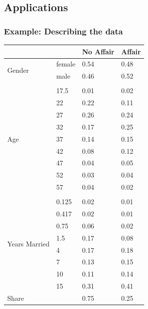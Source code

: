 \documentclass{beamer}
\newcommand{\1}{\mathbb{1}}
\begin{document}
\subsection{Applications}

\begin{frame}
\end{frame}

\begin{frame}\frametitle{Example: Describing the data}
{\tiny
\begin{table}[ht]
\centering
\begin{tabular}{llll}
  \toprule 
 & & No Affair & Affair \\ \hline \hline 
 \multirow{2}{*}{Gender} & female & 0.54 & 0.48 \\ 
     & male & 0.46 & 0.52 \\ \\
  \multirow{9}{*}{Age} & 17.5 & 0.01 & 0.02 \\ 
    & 22 & 0.22 & 0.11 \\ 
    & 27 & 0.26 & 0.24 \\ 
    & 32 & 0.17 & 0.25 \\ 
    & 37 & 0.14 & 0.15 \\ 
    & 42 & 0.08 & 0.12 \\ 
    & 47 & 0.04 & 0.05 \\ 
    & 52 & 0.03 & 0.04 \\ 
    & 57 & 0.04 & 0.02 \\ \\
  \multirow{8}{*}{Years Married} & 0.125 & 0.02 & 0.01 \\ 
      & 0.417 & 0.02 & 0.01 \\ 
    & 0.75 & 0.06 & 0.02 \\ 
    & 1.5 & 0.17 & 0.08 \\ 
    & 4 & 0.17 & 0.18 \\ 
    & 7 & 0.13 & 0.15 \\ 
    & 10 & 0.11 & 0.14 \\ 
    & 15 & 0.31 & 0.41 \\ 
  Share &  & 0.75 & 0.25 \\ 
   \bottomrule 
\end{tabular}
\end{table}} 
\end{frame}
\end{document}
